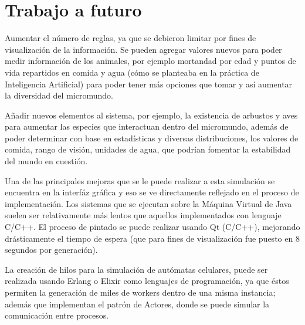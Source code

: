 \chapter{Trabajo a futuro}
  Aumentar el número de reglas, ya que se debieron limitar por fines de visualización de la información. Se pueden agregar valores nuevos para poder medir información de los animales, por ejemplo mortandad por edad y puntos de vida repartidos en comida y agua (cómo se planteaba en la práctica de Inteligencia Artificial) para poder tener más opciones que tomar y así aumentar la diversidad del micromundo.

  Añadir nuevos elementos al sistema, por ejemplo, la existencia de arbustos y aves para aumentar las especies que interactuan dentro del micromundo, además de poder determinar con base en estadísticas y diversas distribuciones, los valores de comida, rango de visión, unidades de agua, que podrían fomentar la estabilidad del mundo en cuestión.

  Una de las principales mejoras que se le puede realizar a esta simulación se encuentra en la interfáz gráfica y eso se ve directamente reflejado en el proceso de implementación. Los sistemas que se ejecutan sobre la Máquina Virtual de Java suelen ser relativamente más lentos que aquellos implementados con lenguaje C/C++. El proceso de pintado se puede realizar usando Qt (C/C++), mejorando drásticamente el tiempo de espera (que para fines de visualización fue puesto en 8 segundos por generación). 

  La creación de hilos para la simulación de autómatas celulares, puede ser realizada usando Erlang o Elixir como lenguajes de programación, ya que éstos permiten la generación de miles de workers dentro de una misma instancia; además que implementan el patrón de Actores, donde se puede simular la comunicación entre procesos.
